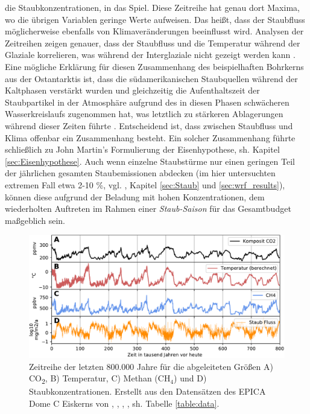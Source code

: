 \documentclass[12pt,a4paper,onecolumn,headheight=30pt]{scrartcl}
\newcommand{\cotwo}{CO\textsubscript{2}}
\begin{document}
die Staubkonzentrationen, in das Spiel. Diese Zeitreihe hat genau dort Maxima, wo die übrigen Variablen geringe Werte aufweisen. Das heißt, dass der Staubfluss möglicherweise ebenfalls von Klimaveränderungen beeinflusst wird. Analysen der Zeitreihen zeigen genauer, dass der Staubfluss und die Temperatur während der Glaziale korrelieren, was während der Interglaziale nicht gezeigt werden kann \citep{Lambert.2008}. Eine mögliche Erklärung für diesen Zusammenhang des beispielhaften Bohrkerns aus der Ostantarktis ist, dass die südamerikanischen Staubquellen während der Kaltphasen verstärkt wurden und gleichzeitig die Aufenthaltszeit der Staubpartikel in der Atmosphäre aufgrund des in diesen Phasen schwächeren Wasserkreislaufs zugenommen hat, was letztlich zu stärkeren Ablagerungen während dieser Zeiten führte \citep{Lambert.2008}. Entscheidend ist, dass zwischen Staubfluss und Klima offenbar ein Zusammenhang besteht. Ein solcher Zusammenhang führte schließlich zu John Martin's Formulierung der Eisenhypothese, sh. Kapitel \ref{sec:Eisenhypothese}. Auch wenn einzelne Staubstürme nur einen geringen Teil der jährlichen gesamten Staubemissionen abdecken (im hier untersuchten extremen Fall etwa 2-10 \%, vgl. \citep{Shao.2011}, Kapitel \ref{sec:Staub} und \ref{sec:wrf_results}), können diese aufgrund der Beladung mit hohen Konzentrationen, dem wiederholten Auftreten im Rahmen einer \textit{Staub-Saison} für das Gesamtbudget maßgeblich sein. \par
\begin{figure}[htbp]
\centering
\includegraphics[width=\textwidth]{bilder/epica_icecore.pdf}
\caption{Zeitreihe der letzten 800.000 Jahre für die abgeleiteten Größen A) \cotwo, B) Temperatur, C) Methan (CH$_4$) und D) Staubkonzentrationen. Erstellt aus den Datensätzen des EPICA Dome C Eiskerns von \cite{Jouzel.2007}, \cite{Lambert.2012}, \cite{Loulergue.2008}, \cite{Bereiter.2015}, sh. Tabelle \ref{table:data}.}   \label{fig:icecore}
\end{figure}
\end{document}
